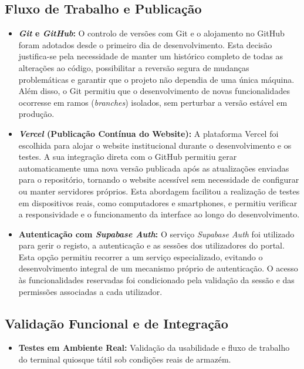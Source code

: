 \subsection{Fluxo de Trabalho e Publicação}
\begin{itemize}
    \item \textbf{\textit{Git} e \textit{GitHub}:} O controlo de versões com Git e o alojamento no GitHub foram adotados desde o primeiro dia de desenvolvimento. Esta decisão justifica-se pela necessidade de manter um histórico completo de todas as alterações ao código, possibilitar a reversão segura de mudanças problemáticas e garantir que o projeto não dependia de uma única máquina. Além disso, o Git permitiu que o desenvolvimento de novas funcionalidades ocorresse em ramos (\textit{branches}) isolados, sem perturbar a versão estável em produção.
    \item \textbf{\textit{Vercel} (Publicação Contínua do Website):} A plataforma Vercel foi escolhida para alojar o website institucional durante o desenvolvimento e os testes. A sua integração direta com o GitHub permitiu gerar automaticamente uma nova versão publicada após as atualizações enviadas para o repositório, tornando o website acessível sem necessidade de configurar ou manter servidores próprios. Esta abordagem facilitou a realização de testes em dispositivos reais, como computadores e smartphones, e permitiu verificar a responsividade e o funcionamento da interface ao longo do desenvolvimento.
    \item \textbf{Autenticação com \textit{Supabase Auth}:} O serviço \textit{Supabase Auth} foi utilizado para gerir o registo, a autenticação e as sessões dos utilizadores do portal. Esta opção permitiu recorrer a um serviço especializado, evitando o desenvolvimento integral de um mecanismo próprio de autenticação. O acesso às funcionalidades reservadas foi condicionado pela validação da sessão e das permissões associadas a cada utilizador.
\end{itemize}

\subsection{Validação Funcional e de Integração}
\begin{itemize}
    \item \textbf{Testes em Ambiente Real:} Validação da usabilidade e fluxo de trabalho do terminal quiosque tátil sob condições reais de armazém.
\end{itemize}


